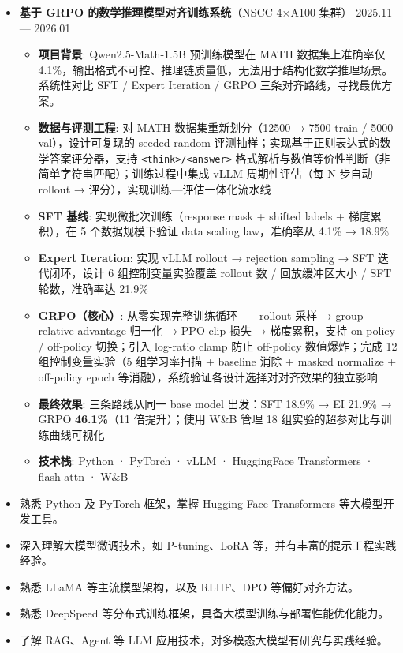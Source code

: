 \documentclass[zh]{resume}
\begin{document}
\begin{itemize}
\begin{itemize}
        \item \textbf{技术栈}: Python · PyTorch · vLLM · QLoRA · bitsandbytes · HuggingFace Transformers · flash-attn
    \end{itemize}
    \item \textbf{基于 GRPO 的数学推理模型对齐训练系统}（NSCC 4×A100 集群） \hfill 2025.11 --- 2026.01
    \begin{itemize}
        \item \textbf{项目背景}: Qwen2.5-Math-1.5B 预训练模型在 MATH 数据集上准确率仅 4.1\%，输出格式不可控、推理链质量低，无法用于结构化数学推理场景。系统性对比 SFT / Expert Iteration / GRPO 三条对齐路线，寻找最优方案。
        \item \textbf{数据与评测工程}: 对 MATH 数据集重新划分（12500 → 7500 train / 5000 val），设计可复现的 seeded random 评测抽样；实现基于正则表达式的数学答案评分器，支持 \texttt{<think>/<answer>} 格式解析与数值等价性判断（非简单字符串匹配）；训练过程中集成 vLLM 周期性评估（每 N 步自动 rollout → 评分），实现训练—评估一体化流水线
        \item \textbf{SFT 基线}: 实现微批次训练（response mask + shifted labels + 梯度累积），在 5 个数据规模下验证 data scaling law，准确率从 4.1\% → 18.9\%
        \item \textbf{Expert Iteration}: 实现 vLLM rollout → rejection sampling → SFT 迭代闭环，设计 6 组控制变量实验覆盖 rollout 数 / 回放缓冲区大小 / SFT 轮数，准确率达 21.9\%
        \item \textbf{GRPO（核心）}: 从零实现完整训练循环——rollout 采样 → group-relative advantage 归一化 → PPO-clip 损失 → 梯度累积，支持 on-policy / off-policy 切换；引入 log-ratio clamp 防止 off-policy 数值爆炸；完成 12 组控制变量实验（5 组学习率扫描 + baseline 消除 + masked normalize + off-policy epoch 等消融），系统验证各设计选择对对齐效果的独立影响
        \item \textbf{最终效果}: 三条路线从同一 base model 出发：SFT 18.9\% → EI 21.9\% → GRPO \textbf{46.1\%}（11 倍提升）；使用 W\&B 管理 18 组实验的超参对比与训练曲线可视化
        \item \textbf{技术栈}: Python · PyTorch · vLLM · HuggingFace Transformers · flash-attn · W\&B
    \end{itemize}

\end{itemize}

\begin{itemize}
    \item 熟悉 Python 及 PyTorch 框架，掌握 Hugging Face Transformers 等大模型开发工具。
    \item 深入理解大模型微调技术，如 P-tuning、LoRA 等，并有丰富的提示工程实践经验。
    \item 熟悉 LLaMA 等主流模型架构，以及 RLHF、DPO 等偏好对齐方法。
    \item 熟悉 DeepSpeed 等分布式训练框架，具备大模型训练与部署性能优化能力。
    \item 了解 RAG、Agent 等 LLM 应用技术，对多模态大模型有研究与实践经验。
\end{itemize}
\end{document}
